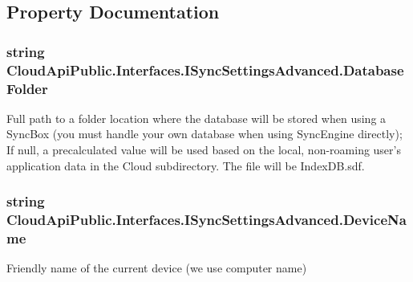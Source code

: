 \subsection{Property Documentation}
\hypertarget{interface_cloud_api_public_1_1_interfaces_1_1_i_sync_settings_advanced_a3e0380120ac6062772306878cb2a948c}{
\subsubsection[{Database\-Folder}]{\setlength{\rightskip}{0pt plus 5cm}string Cloud\-Api\-Public.\-Interfaces.\-I\-Sync\-Settings\-Advanced.\-Database\-Folder\hspace{0.3cm}{\ttfamily [get]}}}\label{interface_cloud_api_public_1_1_interfaces_1_1_i_sync_settings_advanced_a3e0380120ac6062772306878cb2a948c}


Full path to a folder location where the database will be stored when using a Sync\-Box (you must handle your own database when using Sync\-Engine directly); If null, a precalculated value will be used based on the local, non-\/roaming user's application data in the Cloud subdirectory. The file will be Index\-D\-B.\-sdf. 

\hypertarget{interface_cloud_api_public_1_1_interfaces_1_1_i_sync_settings_advanced_a6c77d27d7e668673e0739f84d500e5f4}{
\subsubsection[{Device\-Name}]{\setlength{\rightskip}{0pt plus 5cm}string Cloud\-Api\-Public.\-Interfaces.\-I\-Sync\-Settings\-Advanced.\-Device\-Name\hspace{0.3cm}{\ttfamily [get]}}}\label{interface_cloud_api_public_1_1_interfaces_1_1_i_sync_settings_advanced_a6c77d27d7e668673e0739f84d500e5f4}


Friendly name of the current device (we use computer name) 

